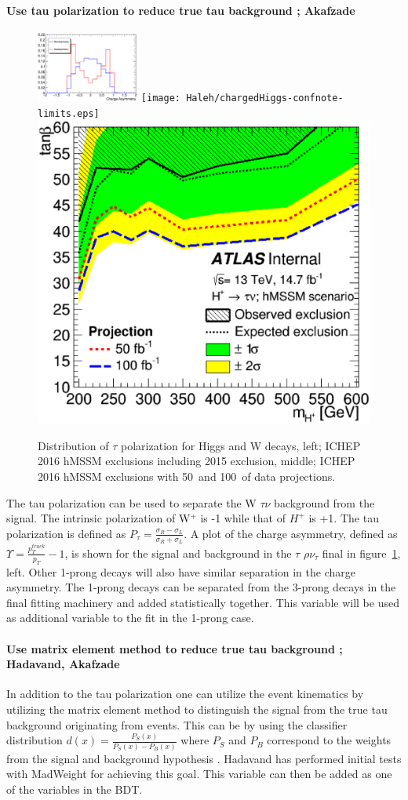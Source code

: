 \paragraph{Use tau polarization to reduce true tau background ; Akafzade}
\begin{figure}\label{fig:plot1}
\begin{center}
\includegraphics[height=0.25\textwidth, width=0.30\textwidth]{Haleh/tauAsy.eps}
\texttt{[image: Haleh/chargedHiggs-confnote-limits.eps]}
\includegraphics[height=0.27\textwidth]{Haleh/WithProjection_exclusion_run2016taunu_v2_hmssm_taunu.eps}
\caption{Distribution of $\tau$ polarization for Higgs and W decays, left; ICHEP 2016 hMSSM exclusions including 2015 exclusion, middle; ICHEP 2016 hMSSM exclusions with 50\invfb\ and 100\invfb\ of data projections.}
\label{fig:tau}
\end{center}
\end{figure}
The tau polarization can be used to separate the W \too $\tau \nu$ background from the signal.  The intrinsic polarization of W$^+$ is -1 while that of $H^+$ is +1.  The tau polarization is defined as $P_{\tau}=\frac{\sigma_R - \sigma_L}{\sigma_R + \sigma_L}$.
A plot of the charge asymmetry, defined as $\Upsilon=\frac{p_{T}^{track}}{p_T} - 1$, is shown for the signal and background in the $\tau$ \too $\rho \nu_{\tau}$ final in figure~\ref{fig:tau}, left. Other 1-prong decays will also have similar separation in the charge asymmetry. 
The 1-prong decays can be separated from the 3-prong decays in the final fitting machinery and added statistically together.  This variable will be used as additional variable to the fit in the 1-prong case.

\paragraph{Use matrix element method to reduce true tau background ;  Hadavand, Akafzade}
In addition to the tau polarization one can utilize the event kinematics by utilizing the matrix element method to distinguish the signal from the true tau background originating from \ttbar events.  
This can be by using the classifier distribution $d(x)=\frac{P_S(x)}{P_S(x)-P_B(x)}$ where $P_S$ and $P_B$ correspond to the weights from the signal and background 
hypothesis . Hadavand has performed initial tests with MadWeight for achieving this goal. This variable can then be added as one of the variables in the BDT. 

